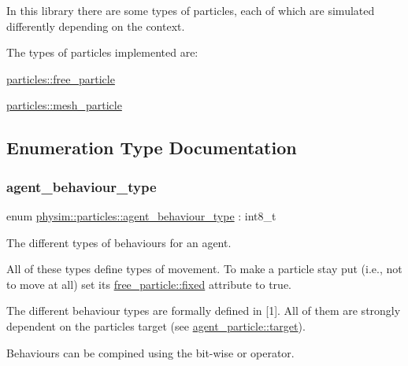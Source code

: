 In this library there are some types of particles, each of which are simulated differently depending on the context.

The types of particles implemented are\+:
\begin{DoxyItemize}
\item \hyperlink{classphysim_1_1particles_1_1free__particle}{particles\+::free\+\_\+particle}
\item \hyperlink{classphysim_1_1particles_1_1mesh__particle}{particles\+::mesh\+\_\+particle} 
\end{DoxyItemize}

\subsection{Enumeration Type Documentation}
\mbox{\label{namespacephysim_1_1particles_a033757595f7862a0fc8a389d79bf9c88}} 
\subsubsection{\texorpdfstring{agent\+\_\+behaviour\+\_\+type}{agent\_behaviour\_type}}
{\footnotesize\ttfamily enum \hyperlink{namespacephysim_1_1particles_a033757595f7862a0fc8a389d79bf9c88}{physim\+::particles\+::agent\+\_\+behaviour\+\_\+type} \+: int8\+\_\+t\hspace{0.3cm}{\ttfamily [strong]}}



The different types of behaviours for an agent. 

All of these types define types of movement. To make a particle stay put (i.\+e., not to move at all) set its \hyperlink{classphysim_1_1particles_1_1free__particle_a0f6d69caeac140abd74c7be4ed55eb74}{free\+\_\+particle\+::fixed} attribute to \textquotesingle{}true\textquotesingle{}.

The different behaviour types are formally defined in \mbox{[}1\mbox{]}. All of them are strongly dependent on the particle\textquotesingle{}s target (see \hyperlink{classphysim_1_1particles_1_1agent__particle_a0658207e11a5d39844856233ae8bf2cb}{agent\+\_\+particle\+::target}).

Behaviours can be compined using the bit-\/wise or operator.

